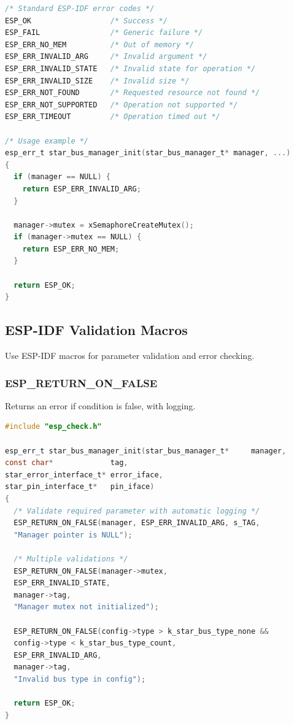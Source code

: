 \begin{lstlisting}[language=C]
/* Standard ESP-IDF error codes */
ESP_OK                  /* Success */
ESP_FAIL                /* Generic failure */
ESP_ERR_NO_MEM          /* Out of memory */
ESP_ERR_INVALID_ARG     /* Invalid argument */
ESP_ERR_INVALID_STATE   /* Invalid state for operation */
ESP_ERR_INVALID_SIZE    /* Invalid size */
ESP_ERR_NOT_FOUND       /* Requested resource not found */
ESP_ERR_NOT_SUPPORTED   /* Operation not supported */
ESP_ERR_TIMEOUT         /* Operation timed out */

/* Usage example */
esp_err_t star_bus_manager_init(star_bus_manager_t* manager, ...)
{
  if (manager == NULL) {
    return ESP_ERR_INVALID_ARG;
  }
  
  manager->mutex = xSemaphoreCreateMutex();
  if (manager->mutex == NULL) {
    return ESP_ERR_NO_MEM;
  }
  
  return ESP_OK;
}
\end{lstlisting}

\subsection{ESP-IDF Validation Macros}

Use ESP-IDF macros for parameter validation and error checking.

\subsubsection{ESP\_RETURN\_ON\_FALSE}

Returns an error if condition is false, with logging.

\begin{lstlisting}[language=C]
#include "esp_check.h"

esp_err_t star_bus_manager_init(star_bus_manager_t*     manager,
const char*             tag,
star_error_interface_t* error_iface,
star_pin_interface_t*   pin_iface)
{
  /* Validate required parameter with automatic logging */
  ESP_RETURN_ON_FALSE(manager, ESP_ERR_INVALID_ARG, s_TAG,
  "Manager pointer is NULL");
  
  /* Multiple validations */
  ESP_RETURN_ON_FALSE(manager->mutex,
  ESP_ERR_INVALID_STATE,
  manager->tag,
  "Manager mutex not initialized");
  
  ESP_RETURN_ON_FALSE(config->type > k_star_bus_type_none &&
  config->type < k_star_bus_type_count,
  ESP_ERR_INVALID_ARG,
  manager->tag,
  "Invalid bus type in config");
  
  return ESP_OK;
}
\end{lstlisting}

